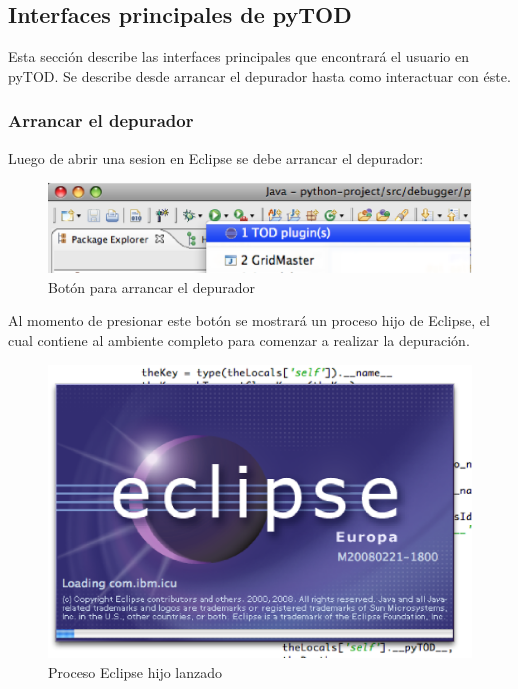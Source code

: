 \documentclass[12pt,legalpaper]{report}
\begin{document}
\newpage	
		\subsection{Interfaces principales de pyTOD}
		
Esta sección describe las interfaces principales que encontrará el usuario en pyTOD.  Se describe desde arrancar el depurador hasta como interactuar con éste.

			\subsubsection{Arrancar el depurador}	

Luego de abrir una sesion en Eclipse se debe arrancar el depurador:

\begin{figure}[h]
	\centering
	\includegraphics[scale=0.4]{images/interfacesPlugin/arrancarTOD.eps}
	\caption{Botón para arrancar el depurador}
\end{figure}

Al momento de presionar este botón se mostrará un proceso hijo de Eclipse, el cual contiene al ambiente completo para comenzar a realizar la depuración.

\begin{figure}[h]
	\centering
	\includegraphics[scale=0.4]{images/interfacesPlugin/arrancarTOD-2.eps}
	\caption{Proceso Eclipse hijo lanzado}
\end{figure}
\end{document}
